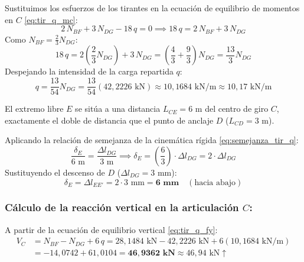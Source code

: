 
Sustituimos los esfuerzos de los tirantes en la ecuación de equilibrio de momentos en $C$ \eqref{eq:tir_q_mc}:
\begin{equation}
    2\,N_{BF} + 3\,N_{DG} - 18\,q = 0 \implies 18\,q = 2\,N_{BF} + 3\,N_{DG}
\end{equation}
Como $N_{BF} = \frac{2}{3}N_{DG}$:
\begin{equation}
    18\,q = 2\left(\frac{2}{3}N_{DG}\right) + 3\,N_{DG} = \left(\frac{4}{3} + \frac{9}{3}\right) N_{DG} = \frac{13}{3} N_{DG}
\end{equation}
Despejando la intensidad de la carga repartida $q$:
\begin{equation}
    q = \frac{13}{54} N_{DG} = \frac{13}{54} (42{,}2226\text{ kN}) \approx \boxed{10{,}1684\text{ kN/m} \approx 10{,}17\text{ kN/m}}
\end{equation}


El extremo libre $E$ se sitúa a una distancia $L_{CE} = 6\text{ m}$ del centro de giro $C$, exactamente el doble de distancia que el punto de anclaje $D$ ($L_{CD} = 3\text{ m}$).

Aplicando la relación de semejanza de la cinemática rígida \eqref{eq:semejanza_tir_q}:
\begin{equation}
    \frac{\delta_E}{6\text{ m}} = \frac{\Delta l_{DG}}{3\text{ m}} \implies \delta_E = \left(\frac{6}{3}\right) \cdot \Delta l_{DG} = 2 \cdot \Delta l_{DG}
\end{equation}
Sustituyendo el descenso de $D$ ($\Delta l_{DG} = 3\text{ mm}$):
\begin{equation}
    \boxed{\delta_E = \Delta l_{EE'} = 2 \cdot 3\text{ mm} = \mathbf{6\text{ mm}} \quad (\text{hacia abajo})}
\end{equation}

\subsubsection*{Cálculo de la reacción vertical en la articulación $C$:}
A partir de la ecuación de equilibrio vertical \eqref{eq:tir_q_fy}:
\begin{align}
    V_C & = N_{BF} - N_{DG} + 6\,q = 28{,}1484\text{ kN} - 42{,}2226\text{ kN} + 6(10{,}1684\text{ kN/m}) \nonumber \\
        & = -14{,}0742 + 61{,}0104 = \mathbf{46{,}9362\text{ kN}} \approx \boxed{46{,}94\text{ kN} \uparrow}
\end{align}


